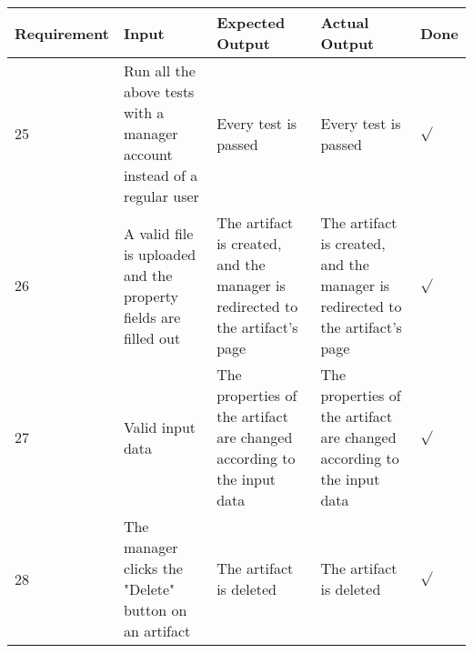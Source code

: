 {\centering
\scalebox{0.7}
{\begin{tabular}{ | p{2cm} | p{3cm} | p{4cm} | p{4cm} | p{0.6cm} | }
	\hline
	Requirement & Input & Expected Output & Actual Output & Done \\
	\hline
	25 & Run all the above tests with a manager account instead of a regular user & Every test is passed & Every test is passed & $\sqrt{}$ \\
	\hline
	26 & A valid file is uploaded and the property fields are filled out & The artifact is created, and the manager is redirected to the artifact's page & The artifact is created, and the manager is redirected to the artifact's page & $\sqrt{}$ \\
	\hline
	27 & Valid input data & The properties of the artifact are changed according to the input data & The properties of the artifact are changed according to the input data & $\sqrt{}$ \\
	\hline
	28 & The manager clicks the "Delete" button on an artifact & The artifact is deleted & The artifact is deleted & $\sqrt{}$ \\
	\hline
\end{tabular}}}

